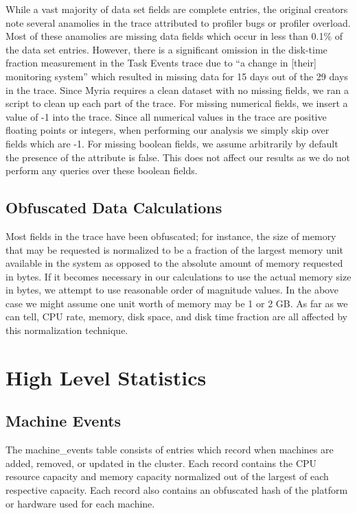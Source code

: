 \documentclass{sig-alternate}
\begin{document}
While a vast majority of data set fields are complete entries, the original creators note several anamolies in the trace attributed to profiler bugs or profiler overload.
Most of these anamolies are missing data fields which occur in less than 0.1\% of the data set entries.
However, there is a significant omission in the disk-time fraction measurement in the Task Events trace due to ``a change in [their] monitoring system'' which resulted in missing data for 15 days out of the 29 days in the trace.
Since Myria requires a clean dataset with no missing fields, we ran a script to clean up each part of the trace.
For missing numerical fields, we insert a value of -1 into the trace.
Since all numerical values in the trace are positive floating points or integers, when performing our analysis we simply skip over fields which are -1.
For missing boolean fields, we assume arbitrarily by default the presence of the attribute is false.
This does not affect our results as we do not perform any queries over these boolean fields.

\subsection{Obfuscated Data Calculations}

Most fields in the trace have been obfuscated; for instance, the size of memory that may be requested is normalized to be a fraction of the largest memory unit available in the system as opposed to the absolute amount of memory requested in bytes.
If it becomes necessary in our calculations to use the actual memory size in bytes, we attempt to use reasonable order of magnitude values.
In the above case we might assume one unit worth of memory may be 1 or 2 GB.
As far as we can tell, CPU rate, memory, disk space, and disk time fraction are all affected by this normalization technique.

\section{High Level Statistics}

\subsection{Machine Events}

The machine\_events table consists of entries which record when machines are added, removed, or updated in the cluster.
Each record contains the CPU resource capacity and memory capacity normalized out of the largest of each respective capacity.
Each record also contains an obfuscated hash of the platform or hardware used for each machine.
\end{document}
